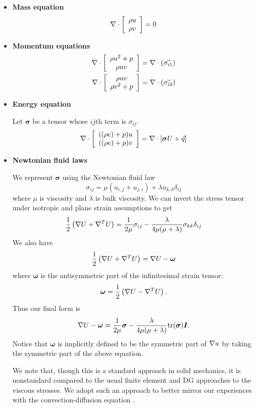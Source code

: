 \begin{itemize}
\item \textbf{Mass equation}
\[
\div \vecttwo{\rho u }{\rho v} = 0
\]
\item \textbf{Momentum equations}
\begin{align*}
\div \vecttwo{\rho u^2+p }{\rho u v} &= \div\left(\vec{\sigma_{i1}}\right)\\
\div \vecttwo{\rho u v}{\rho v^2+p } &= \div\left(\vec{\sigma_{i2}}\right)
\end{align*}

\item \textbf{Energy equation}

Let $\boldsymbol \sigma$ be a tensor whose $ij$th term is $\sigma_{ij}$.  
\[
\div\vecttwo{((\rho e)+p)u}{((\rho e)+p)v} = \div\left[\boldsymbol\sigma U + \vec{q}\right]
\]

\item \textbf{Newtonian fluid laws}

We represent $\boldsymbol\sigma$ using the Newtonian fluid law
\[
\sigma_{ij} = \mu(u_{i,j} + u_{j,i}) + \lambda u_{k,k} \delta_{ij}
\]
where $\mu$ is viscosity and $\lambda$ is bulk viscosity. 
We can invert the stress tensor under isotropic and plane strain assumptions to get
\[
\frac{1}{2}\left(\grad  U + \grad ^T  U\right) = \frac{1}{2\mu} \sigma_{ij} - \frac{\lambda}{4\mu (\mu + \lambda)} \sigma_{kk}\delta_{ij}
\]
We also have
\[
\frac{1}{2}\left(\grad  U + \grad ^T  U\right) = \grad  U - \boldsymbol \omega
\]
where $\boldsymbol \omega$ is the antisymmetric part of the infinitesimal strain tensor:
\[
\boldsymbol \omega = \frac{1}{2}\left(\grad  U - \grad ^T  U\right).
\]
Thus our final form is
\begin{align*}
\grad  U - \boldsymbol \omega = \frac{1}{2\mu} \boldsymbol \sigma - \frac{\lambda}{4\mu (\mu + \lambda)} { \rm tr}(\boldsymbol \sigma) \boldsymbol I.
\end{align*}
Notice that $\boldsymbol \omega$ is implicitly defined to be the symmetric part of $\grad u$ by taking the symmetric part of the above equation. 

We note that, though this is a standard approach in solid mechanics, it is nonstandard compared to the usual finite element and DG approaches to the viscous stresses. We adopt such an approach to better mirror our experiences with the convection-diffusion equation \cite{DPGrobustness,DPGrobustness2}. 


\end{itemize}
